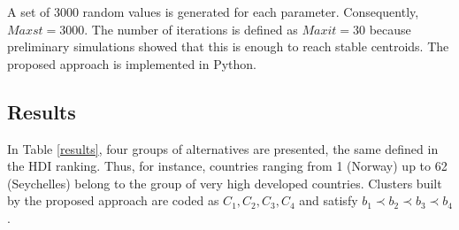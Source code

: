 \documentclass[]{elsarticle}
\theoremstyle{definition}
\begin{document}
\noindent
A set of 3000 random values is generated for each parameter. Consequently, $Maxst=3000$.  The number of iterations is defined as $Maxit=30$ because preliminary simulations showed that this is enough to reach stable centroids. The proposed approach is implemented in Python.  

\subsection{Results}

In Table \ref{results}, four groups of alternatives  are presented, the same defined in the HDI ranking.  Thus, for instance,  countries ranging from  1 (Norway) up to 62 (Seychelles) belong to the group of very high developed countries. Clusters built by the proposed approach are coded as $C_1, C_2, C_3, C_4$ and satisfy $b_1 \prec  b_2 \prec b_3 \prec b_4$.  




\newcommand\items{4}   %
\end{document}
